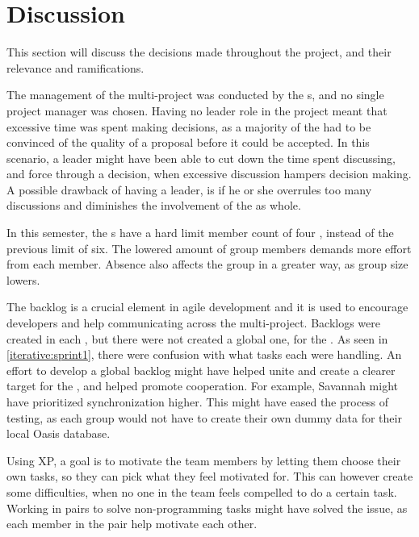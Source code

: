 \chapter{Discussion}
This section will discuss the decisions made throughout the project, and their relevance and ramifications. \newline

The management of the multi-project was conducted by the \localgroup[]s, and no single project manager was chosen.
Having no leader role in the project meant that excessive time was spent making decisions, as a majority of the \globalgroup[] had to be convinced of the quality of a proposal before it could be accepted.
In this scenario, a leader might have been able to cut down the time spent discussing, and force through a decision, when excessive discussion hampers decision making.
A possible drawback of having a leader, is if he or she overrules too many discussions and diminishes the involvement of the \globalgroup[] as whole.\newline

In this semester, the \localgroup[]s have a hard limit member count of four \citep{web:rammestudyreg}, instead of the previous limit of six.
The lowered amount of group members demands more effort from each member.
Absence also affects the group in a greater way, as group size lowers.\newline

The backlog is a crucial element in agile development and it is used to encourage developers and help communicating across the multi-project.
Backlogs were created in each \localgroup[], but there were not created a global one, for the \globalgroup[].
As seen in \autoref{iterative:sprint1}, there were confusion with what tasks each \localgroup[] were handling.
An effort to develop a global backlog might have helped unite and create a clearer target for the \globalgroup[], and helped promote cooperation.
For example, Savannah might have prioritized synchronization higher.
This might have eased the process of testing, as each group would not have to create their own dummy data for their local Oasis database.

Using XP, a goal is to motivate the team members by letting them choose their own tasks, so they can pick what they feel motivated for.  This can however create some difficulties, when no one in the team feels compelled to do a certain task.
Working in pairs to solve non-programming tasks might have solved the issue, as each member in the pair help motivate each other. 

